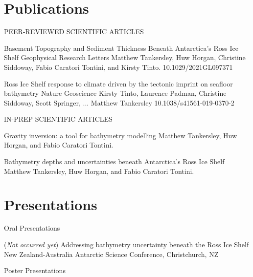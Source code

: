\documentclass{ExpressiveResume}
\begin{document}
\section{Publications}
\noindent PEER-REVIEWED SCIENTIFIC ARTICLES \newline

\begin{cventries}
    {Basement Topography and Sediment Thickness Beneath Antarctica’s Ross Ice Shelf}
    {Geophysical Research Letters}
    {Matthew Tankersley, Huw Horgan, Christine Siddoway, Fabio Caratori Tontini, and Kirsty Tinto.}
    {10.1029/2021GL097371}

    {Ross Ice Shelf response to climate driven by the tectonic
        imprint on seafloor bathymetry}
    {Nature Geoscience}
    {Kirsty Tinto, Laurence Padman, Christine Siddoway, Scott Springer, ... Matthew Tankersley}
    {10.1038/s41561-019-0370-2}
\end{cventries}


\noindent IN-PREP SCIENTIFIC ARTICLES \newline

\begin{cventries}
    {Gravity inversion: a tool for bathymetry modelling}
    {Matthew Tankersley, Huw Horgan, and Fabio Caratori Tontini.}

    {Bathymetry depths and uncertainties beneath Antarctica's Ross Ice Shelf}
    {Matthew Tankersley, Huw Horgan, and Fabio Caratori Tontini.}

\end{cventries}


\section{Presentations}
\noindent Oral Presentations \newline

\begin{cventries}
    {(\textit{Not occurred yet}) Addressing bathymetry uncertainty beneath the Ross Ice Shelf}
    {New Zealand-Australia Antarctic Science Conference, Christchurch, NZ}
    {}
    {}

\end{cventries}

\noindent Poster Presentations \newline
\end{document}
